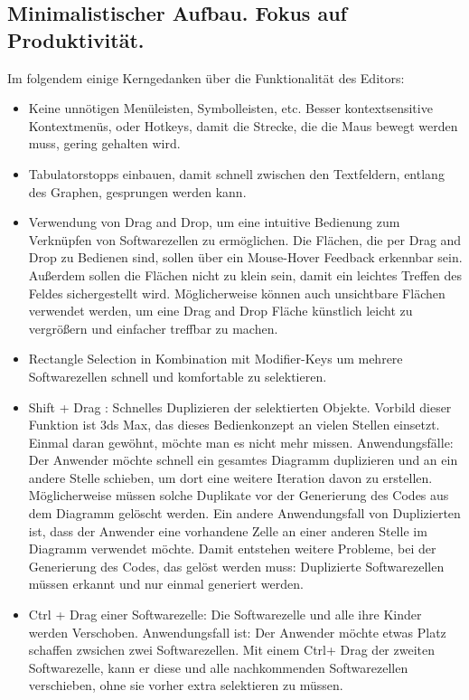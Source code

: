 \subsection{Minimalistischer Aufbau. Fokus auf Produktivität.}

Im folgendem einige Kerngedanken über die Funktionalität des Editors:

\begin{itemize}
\item Keine unnötigen Menüleisten, Symbolleisten, etc. Besser kontextsensitive
Kontextmenüs, oder Hotkeys,  damit die Strecke, die die Maus bewegt werden muss, gering
gehalten wird.
\item Tabulatorstopps einbauen, damit schnell zwischen den Textfeldern, entlang des
Graphen, gesprungen werden kann.
\item Verwendung von Drag and Drop, um eine intuitive Bedienung zum Verknüpfen von
Softwarezellen zu ermöglichen. Die Flächen, die per Drag and Drop zu Bedienen
sind, sollen über ein Mouse-Hover Feedback erkennbar sein. Außerdem sollen die
Flächen nicht zu klein sein, damit ein leichtes Treffen des Feldes
sichergestellt wird. Möglicherweise können auch unsichtbare Flächen verwendet
werden, um eine Drag and Drop Fläche künstlich leicht zu vergrößern und einfacher treffbar zu machen.
\item Rectangle Selection in Kombination mit Modifier-Keys um mehrere Softwarezellen
schnell und komfortable zu selektieren.
\item Shift + Drag : Schnelles Duplizieren der selektierten Objekte. Vorbild dieser
Funktion ist 3ds Max, das dieses Bedienkonzept an vielen Stellen einsetzt.
Einmal daran gewöhnt, möchte man es nicht mehr missen. Anwendungsfälle:
Der Anwender möchte  schnell ein gesamtes Diagramm duplizieren und an ein andere Stelle schieben, um
dort eine weitere Iteration davon zu erstellen. Möglicherweise müssen solche
Duplikate vor der Generierung des Codes aus dem Diagramm gelöscht werden.
Ein andere Anwendungsfall von Duplizierten ist, dass der Anwender eine vorhandene
Zelle an einer anderen Stelle im Diagramm verwendet möchte. Damit
entstehen weitere Probleme, bei der Generierung des Codes, das gelöst werden
muss: Duplizierte Softwarezellen müssen erkannt und nur einmal generiert werden.
\item Ctrl + Drag einer Softwarezelle: Die Softwarezelle und alle ihre Kinder werden
Verschoben. Anwendungsfall ist: Der Anwender möchte etwas Platz schaffen
zwsichen zwei Softwarezellen. Mit einem Ctrl+ Drag der zweiten Softwarezelle,
kann er diese und alle nachkommenden Softwarezellen verschieben, ohne sie
vorher extra selektieren zu müssen.
\end{itemize}

